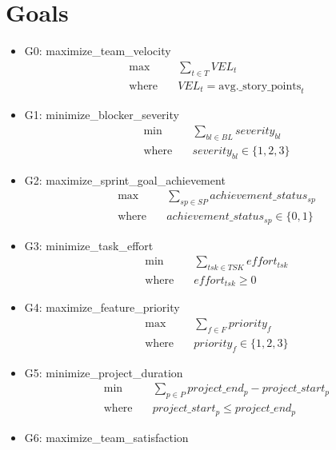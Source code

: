 \documentclass{article}
\begin{document}
\section{Goals}
\begin{itemize}
    \item G0: maximize\_team\_velocity
        \begin{align*}
            \max \quad & \sum_{t \in T} VEL_{t} \\
            \text{where} \quad & VEL_{t} = \text{avg.\_story\_points}_{t}
        \end{align*}
    \item G1: minimize\_blocker\_severity
        \begin{align*}
            \min \quad & \sum_{bl \in BL} severity_{bl} \\
            \text{where} \quad & severity_{bl} \in \{1, 2, 3\}
        \end{align*}
    \item G2: maximize\_sprint\_goal\_achievement
        \begin{align*}
            \max \quad & \sum_{sp \in SP} achievement\_status_{sp} \\
            \text{where} \quad & achievement\_status_{sp} \in \{0, 1\}
        \end{align*}
    \item G3: minimize\_task\_effort
        \begin{align*}
            \min \quad & \sum_{tsk \in TSK} effort_{tsk} \\
            \text{where} \quad & effort_{tsk} \geq 0
        \end{align*}
    \item G4: maximize\_feature\_priority
        \begin{align*}
            \max \quad & \sum_{f \in F} priority_{f} \\
            \text{where} \quad & priority_{f} \in \{1, 2, 3\}
        \end{align*}
    \item G5: minimize\_project\_duration
        \begin{align*}
            \min \quad & \sum_{p \in P} project\_end_{p} - project\_start_{p} \\
            \text{where} \quad & project\_start_{p} \leq project\_end_{p}
        \end{align*}
    \item G6: maximize\_team\_satisfaction
        \begin{align*}

\end{align*}
\end{itemize}
\end{document}
